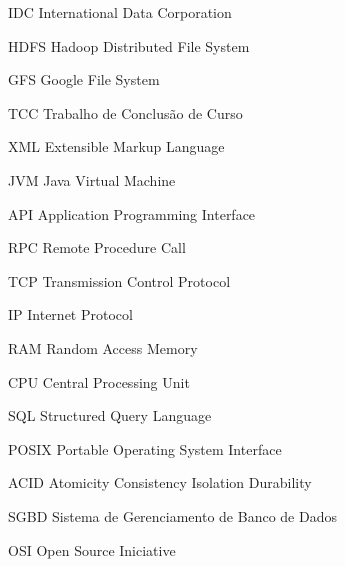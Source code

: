 \begin{siglas}

  \item[IDC] International Data Corporation
  \item[HDFS] Hadoop Distributed File System
  \item[GFS] Google File System
  \item[TCC] Trabalho de Conclusão de Curso
  \item[XML] Extensible Markup Language
  \item[JVM] Java Virtual Machine
  \item[API] Application Programming Interface
  \item[RPC] Remote Procedure Call
  \item[TCP] Transmission Control Protocol
  \item[IP] Internet Protocol
  \item[RAM] Random Access Memory
  \item[CPU] Central Processing Unit
  \item[SQL] Structured Query Language
  \item[POSIX] Portable Operating System Interface
  \item[ACID] Atomicity Consistency Isolation Durability
  \item[SGBD] Sistema de Gerenciamento de Banco de Dados
  \item[OSI] Open Source Iniciative

\end{siglas}
